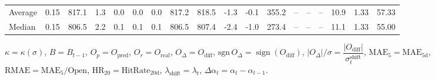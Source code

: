 \begin{threeparttable}
{\begin{tabular}{lrrrrrrrrrrrrrrrrr}
Average &     0.15 & 817.1 &               1.3 &               0.0 &                0.0 &                0.0 & 817.2 & 818.5 &       -1.3 &                     -0.1 &               355.2 &         -- &        -- &             -- &             10.9 &            1.33 &                  57.33 \\
 Median &     0.15 & 806.5 &               2.2 &               0.1 &                0.1 &                0.1 & 806.5 & 807.4 &       -2.4 &                     -1.0 &               273.4 &         -- &        -- &             -- &             11.1 &            1.33 &                  55.00 \\
\bottomrule
\end{tabular}
}
\begin{tablenotes}\footnotesize
\item $\kappa=\kappa(\sigma)$, $B=B_{t-1}$, $O_p=O_{\text{pred}}$, $O_r=O_{\text{real}}$, $O_\Delta=O_{\text{diff}}$, $\mathrm{sgn}\,O_\Delta=\operatorname{sign}(O_{\text{diff}})$, $|O_\Delta|/\sigma=\dfrac{|O_{\text{diff}}|}{\sigma_t^{\text{shift}}}$, $\mathrm{MAE}_5=\mathrm{MAE}_{5\text{d}}$, $\mathrm{RMAE}= \mathrm{MAE}_5 / \text{Open}$, $\mathrm{HR}_{20}=\mathrm{HitRate}_{20\text{d}}$, 
$\lambda_{\text{shift}}=\lambda_t$, 
$\Delta\alpha_t=\alpha_t-\alpha_{t-1}$.
\end{tablenotes}
\end{threeparttable}
\endgroup

